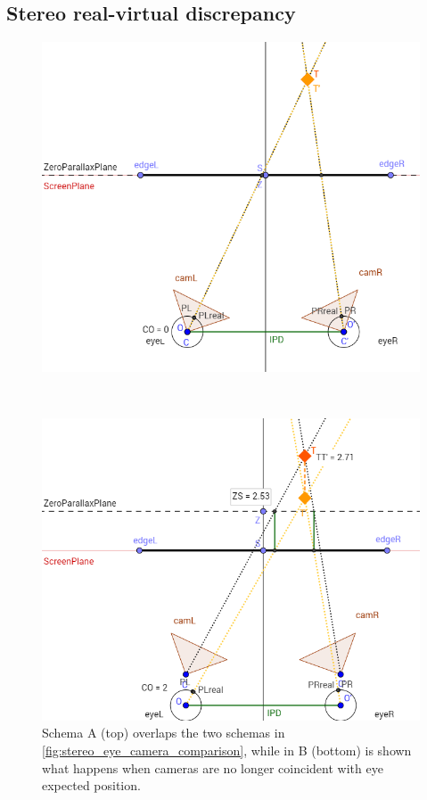 \subsection{Stereo real-virtual discrepancy}

\begin{figure} 
\centering   
\begin{minipage}[t]{0.75\textwidth}
\includegraphics[width=\linewidth]{schemas/stereo_eye_camera_overlap}
\end{minipage}
\\
\begin{minipage}[t]{0.75\textwidth}
\includegraphics[width=\linewidth]{schemas/stereo_eye_camera_offset}
\end{minipage}
\caption{Schema A (top) overlaps the two schemas in \ref{fig:stereo_eye_camera_comparison}, while in B (bottom) is shown what happens when cameras are no longer coincident with eye expected position.}
\label{fig:stereo_eye_camera_overlap}
\end{figure}

